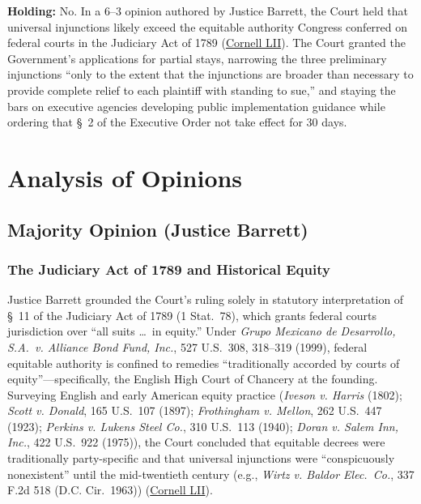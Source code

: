 \documentclass[12pt]{article}
\begin{document}
\textbf{Holding:} No. In a 6--3 opinion authored by Justice Barrett, the Court held that universal injunctions likely exceed the equitable authority Congress conferred on federal courts in the Judiciary Act of 1789 (\href{https://www.law.cornell.edu/supremecourt/text/24A884}{Cornell LII}). The Court granted the Government's applications for partial stays, narrowing the three preliminary injunctions ``only to the extent that the injunctions are broader than necessary to provide complete relief to each plaintiff with standing to sue,'' and staying the bars on executive agencies developing public implementation guidance while ordering that \S\ 2 of the Executive Order not take effect for 30 days.

\section{Analysis of Opinions}
\subsection{Majority Opinion (Justice Barrett)}

\subsubsection{The Judiciary Act of 1789 and Historical Equity}

Justice Barrett grounded the Court's ruling solely in statutory interpretation of \S\ 11 of the Judiciary Act of 1789 (1 Stat.\ 78), which grants federal courts jurisdiction over ``all suits \ldots\ in equity.'' Under \textit{Grupo Mexicano de Desarrollo, S.A.\ v. Alliance Bond Fund, Inc.}, 527 U.S.\ 308, 318--319 (1999), federal equitable authority is confined to remedies ``traditionally accorded by courts of equity''---specifically, the English High Court of Chancery at the founding. Surveying English and early American equity practice (\textit{Iveson v. Harris} (1802); \textit{Scott v. Donald}, 165 U.S.\ 107 (1897); \textit{Frothingham v. Mellon}, 262 U.S.\ 447 (1923); \textit{Perkins v. Lukens Steel Co.}, 310 U.S.\ 113 (1940); \textit{Doran v. Salem Inn, Inc.}, 422 U.S.\ 922 (1975)), the Court concluded that equitable decrees were traditionally party-specific and that universal injunctions were ``conspicuously nonexistent'' until the mid-twentieth century (e.g., \textit{Wirtz v. Baldor Elec.\ Co.}, 337 F.2d 518 (D.C. Cir.\ 1963)) (\href{https://www.law.cornell.edu/supremecourt/text/24A884}{Cornell LII}).
\end{document}
